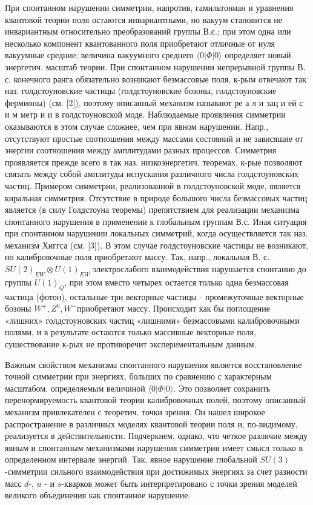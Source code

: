 \documentclass[10pt]{article}
\begin{document}
При спонтанном нарушении симметрии, напротив, гамильтониан и уравнения квантовой теории поля остаются инвариантными, но вакуум становится не инвариантным относительно преобразований группы В.с.; при этом одна или несколько компонент квантованного поля приобретают отличные от нуля вакуумные средние; величина вакуумного среднего $\langle 0|\Phi| 0\rangle$ определяет новый энергетич. масштаб теории. При спонтанном нарушении непрерывной группы В. с. конечного ранга обязательно возникают безмассовые поля, к-рым отвечают так наз. голдстоуновские частицы (голдстоуновские бозоны, голдстоуновские фермионы) (см. [2]), поэтому описанный механизм называют ре а л и зац и ей с и м метр и и в голдстоуновской моде. Наблюдаемые проявления симметрии оказываются в этом случае сложнее, чем при явном нарушении. Напр., отсутствуют простые соотношения между массами состояний и не зависяшие от энергии соотношения между амплитудами разных процессов. Симметрия проявляется прежде всего в так наз. низкоэнергетич. теоремах, к-рые позволяют связать между собой амплитуды испускания различного числа голдстоуновских частиц. Примером симметрии, реализованной в голдстоуновской моде, является киральная симметрия. Отсутствие в природе большого числа безмассовых частиц является (в силу Голдстоуна теоремы) препятствием для реализации механизма спонтанного нарушения в применении к глобальным группам В.с. Иная ситуация при спонтанном нарушении локальных симметрий, когда осуществляется так наз. механизм Хиггса (см. [3]). В этом случае голдстоуновские частицы не возникают, но калибровочные поля приобретают массу. Так, напр., локальная В. с. $S U(2)_{E W} \otimes U(1)_{E W}$ электрослабого взаимодействия нарушается спонтанно до группы $U(1)_{Q}$, при этом вместо четырех остается только одна безмассовая частица (фотон), остальные три векторные частицы - промежуточные векторные бозоны $W^{+}, Z^{0}, W^{-}$приобретают массу. Происходит как бы поглощение «лишних» голдстоуновских частиц «лишними» безмассовыми калибровочными полями, и в результате остаются только массивные векторные поля, сушествование к-рых не противоречит экспериментальным данным.



Важным свойством механизма спонтанного нарушения является восстановление точной симметрии при энергиях, больших по сравнению с характерным масштабом, определяемым величиной $\langle 0|\Phi| 0\rangle$. Это позволяет сохранить перенормируемость квантовой теории калибровочных полей, поэтому описанный механизм привлекателен с теоретич. точки зрения. Он нашел широкое распространение в различных моделях квантовой теории поля и, по-видимому, реализуется в действительности. Подчеркнем, однако, что четкое различие между явным и спонтанным механизмами нарушения симметрии имеет смысл только в определенном интервале энергий. Так, явное нарушение глобальной $S U(3)$-симметрии сильного взаимодействия при достижимых энергиях за счет разности масс $d$-, $u$ - и $s$-кварков может быть интерпретировано с точки зрения моделей великого объединения как спонтанное нарушение.
\end{document}
